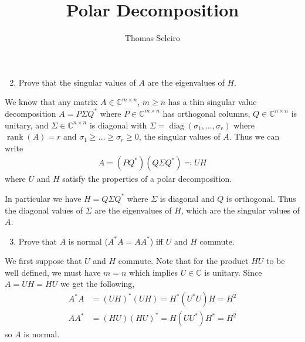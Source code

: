 \documentclass{article}
\DeclareMathOperator{\diag}{diag}
\DeclareMathOperator{\rank}{rank}
\begin{document}
\title{Polar Decomposition}
\author{Thomas Seleiro}
\maketitle


\begin{enumerate}
	\setcounter{enumi}{1}
	\item Prove that the singular values of $A$ are the eigenvalues of $H$.
\end{enumerate}

We know that any matrix $A\in\mathbb{C}^{m \times n}$, $m\geq n$ has 
a thin singular value decomposition $A = P \Sigma Q^*$ where $P \in
\mathbb{C}^{m \times n}$ has orthogonal columns, $Q \in 
\mathbb{C}^{n \times n}$ is unitary, and $\Sigma \in 
\mathbb{C}^{n \times n}$ is diagonal with $\Sigma = \diag(\sigma_1, 
\ldots, \sigma_r)$ where $\rank(A) = r$ and $\sigma_1 \geq \ldots \geq
\sigma_r \geq 0$, the singular values of $A$. Thus we can write
\begin{align}
	A = (PQ^*) (Q \Sigma Q^*) \eqqcolon UH
	\label{eq:PolarSVD}
\end{align}
where $U$ and $H$ satisfy the properties of a polar decomposition.

In particular we have $H = Q \Sigma Q^*$ where $\Sigma$ is diagonal and 
$Q$ is orthogonal. Thus the diagonal values of $\Sigma$ are the 
eigenvalues of $H$, which are the singular values of $A$.

\begin{enumerate}
	\setcounter{enumi}{2}
	\item Prove that $A$ is normal ($A^*A = AA^*$) iff $U$ and $H$
	commute.
\end{enumerate}

We first suppose that $U$ and $H$ commute. Note that for the product
$HU$ to be well defined, we must have $m = n$ which implies
$U\in\mathbb{C}$ is unitary. Since $A = UH = HU$ we get the following,
\begin{align}
	\label{eq:AstarA}
	A^*A &= (UH)^* (UH) = H^*(U^*U)H = H^2 \\
	AA^* &= (HU) (HU)^* = H(UU^*)H^* = H^2
\end{align}
so $A$ is normal.
\end{document}
